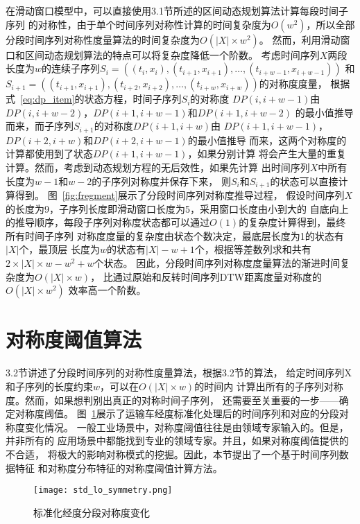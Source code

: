 在滑动窗口模型中，可以直接使用3.1节所述的区间动态规划算法计算每段时间子序列
的对称性，由于单个时间序列对称性计算的时间复杂度为$O(w^2 )$，所以全部
分段时间序列对称性度量算法的时间复杂度为$O\left(|X| \times w^{2}\right)$。
然而，利用滑动窗口和区间动态规划算法的特点可以将复杂度降低一个阶数。
考虑时间序列$X$两段长度为$w$的连续子序列$S_{i}=\left(\left(t_{i}, x_{i}\right),\left(t_{i+1}, x_{i+1}\right), \dots,\left(t_{i+w-1}, x_{i+w-1}\right)\right)$
和$S_{i+1}=\left(\left(t_{i+1}, x_{i+1}\right),\left(t_{i+2}, x_{i+2}\right), \dots,\left(t_{i+w}, x_{i+w}\right)\right)$的对称度度量，
根据式~\ref{eq:dp_item}的状态方程，时间子序列$S_i$的对称度
$D P(i, i+w-1)$由$DP(i,i+w-2)$，$DP(i+1,i+w-1)$和$DP(i+1,i+w-2)$
的最小值推导而来，而子序列$S_{i+1}$的对称度$D P(i+1, i+w)$由
$D P(i+1, i+w-1)$，$DP(i+2,i+w)$和$DP(i+2,i+w-1)$的最小值推导
而来，这两个对称度的计算都使用到了状态$DP(i+1,i+w-1)$，如果分别计算
将会产生大量的重复计算。然而，考虑到动态规划方程的无后效性，如果先计算
出时间序列$X$中所有长度为$w-1$和$w-2$的子序列对称度并保存下来，
则$S_i$和$S_{i+1}$的状态可以直接计算得到。
图~\ref{fig:fregment}展示了分段时间序列对称度推导过程，
假设时间序列$X$的长度为9，子序列长度即滑动窗口长度为5，采用窗口长度由小到大的
自底向上的推导顺序，每段子序列对称度状态都可以通过$O(1)$的复杂度计算得到，最终所有时间子序列
对称度度量的复杂度由状态个数决定，最底层长度为1的状态有$|X|$个，最顶层
长度为$w$的状态有$|X|-w+1$个，根据等差数列求和共有
$2 \times|X| \times w-w^{2}+w$个状态。
因此，分段时间序列对称度度量算法的渐进时间复杂度为$O(|X| \times w)$，
比通过原始和反转时间序列DTW距离度量对称度的$O\left(|X| \times w^{2}\right)$
效率高一个阶数。

\section{对称度阈值算法}
3.2节讲述了分段时间序列的对称性度量算法，根据3.2节的算法，
给定时间序列X和子序列的长度约束$w$，可以在$O(|X| \times w)$的时间内
计算出所有的子序列对称度。然而，如果想判别出真正的对称时间子序列，
还需要至关重要的一步——确定对称度阈值。
图~\ref{fig:lontitude_symmetry}展示了运输车经度标准化处理后的时间序列和对应的分段对称度变化情况。
一般工业场景中，对称度阈值往往是由领域专家输入的。但是，并非所有的
应用场景中都能找到专业的领域专家。并且，如果对称度阈值提供的不合适，
将极大的影响对称模式的挖掘。因此，本节提出了一个基于时间序列数据特征
和对称度分布特征的对称度阈值计算方法。
\begin{figure}
  \centering
  \texttt{[image: std\_lo\_symmetry.png]}
  \caption{标准化经度分段对称度变化}
  \label{fig:lontitude_symmetry}
\end{figure}

